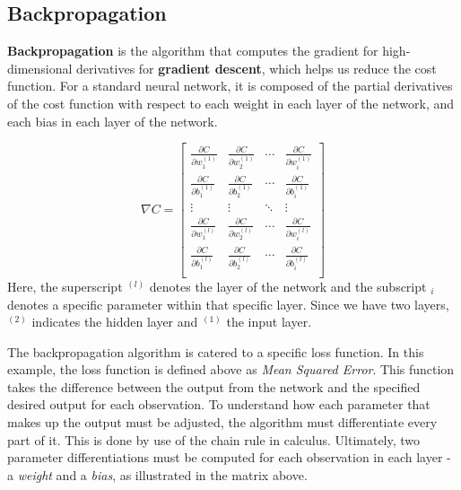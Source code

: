 
\hypertarget{backpropagation}{%
\subsection{Backpropagation}\label{backpropagation}}

\textbf{Backpropagation} is the algorithm that computes the gradient for
high-dimensional derivatives for \textbf{gradient descent}, which helps
us reduce the cost function. For a standard neural network, it is
composed of the partial derivatives of the cost function with respect to
each weight in each layer of the network, and each bias in each layer of
the network.

\[
\nabla{C} =
\begin{bmatrix}
\frac{\partial{C}}{\partial{w_1^{(1)}}} & \frac{\partial{C}}{\partial{w_2^{(1)}}} & \cdots & 
\frac{\partial{C}}{\partial{w_i^{(1)}}} \\
\frac{\partial{C}}{\partial{b_1^{(1)}}} & \frac{\partial{C}}{\partial{b_2^{(1)}}} & \cdots & 
\frac{\partial{C}}{\partial{b_i^{(1)}}} \\
\vdots & \vdots & \ddots & \vdots \\
\frac{\partial{C}}{\partial{w_1^{(l)}}} & \frac{\partial{C}}{\partial{w_2^{(l)}}} & \cdots & 
\frac{\partial{C}}{\partial{w_i^{(l)}}} \\
\frac{\partial{C}}{\partial{b_1^{(l)}}} & \frac{\partial{C}}{\partial{b_2^{(l)}}} & \cdots & 
\frac{\partial{C}}{\partial{b_i^{(l)}}} \\
\end{bmatrix}
\] Here, the superscript \(^{(l)}\) denotes the layer of the network and
the subscript \(_i\) denotes a specific parameter within that specific
layer. Since we have two layers, \(^{(2)}\) indicates the hidden layer
and \(^{(1)}\) the input layer.

The backpropagation algorithm is catered to a specific loss function. In
this example, the loss function is defined above as \emph{Mean Squared
Error}. This function takes the difference between the output from the
network and the specified desired output for each observation. To
understand how each parameter that makes up the output must be adjusted,
the algorithm must differentiate every part of it. This is done by use
of the chain rule in calculus. Ultimately, two parameter
differentiations must be computed for each observation in each layer - a
\emph{weight} and a \emph{bias}, as illustrated in the matrix above.

